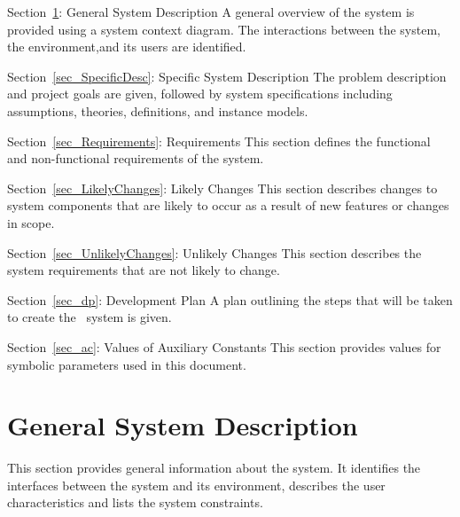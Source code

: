\documentclass[12pt]{article}
\begin{document}
\noindent \begin{description}
\item Section~\ref{sec_GeneralDesc}: General System Description 
\newline
A general overview of the system is provided using a system context diagram. The interactions between the system, the environment,and its users are identified.
\item Section~\ref{sec_SpecificDesc}: Specific System Description 
\newline 
The problem description and project goals are given, followed by system specifications including assumptions, theories, definitions, and instance models.
\item Section~\ref{sec_Requirements}: Requirements
\newline
This section defines the functional and non-functional requirements of the system.
\item Section~\ref{sec_LikelyChanges}: Likely Changes
\newline
This section describes changes to system components that are likely to occur as a result of new features or changes in scope.
\item Section~\ref{sec_UnlikelyChanges}: Unlikely Changes 
\newline
This section describes the system requirements that are not likely to change.
\item Section~\ref{sec_dp}: Development Plan 
\newline
A plan outlining the steps that will be taken to create the \progname\ system is given.
\item Section~\ref{sec_ac}: Values of Auxiliary Constants 
\newline
This section provides values for symbolic parameters used in this document.
\end{description}

\section{General System Description} 
\label{sec_GeneralDesc}

This section provides general information about the system.  It identifies the
interfaces between the system and its environment, describes the user
characteristics and lists the system constraints.  

\end{document}
